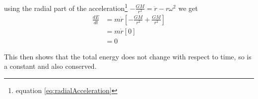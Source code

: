 using the radial part of the acceleration\footnote{equation \ref{eq:radialAcceleration}} $-\frac{GM}{r^2}= \ddot{r} -r \omega^2$ we get
\begin{align}
\frac{dE}{dt}&=m \dot{r}\left[-\frac{GM}{r^2}+\frac{GM}{r^2}\right] \nonumber \\
&=m \dot{r}\left[0\right] \nonumber \\
&=0
\end{align}

This then shows that the total energy does not change with respect to time, so is a constant and also conserved.